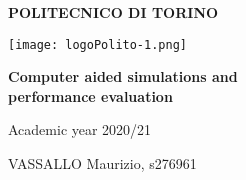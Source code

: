 \documentclass[twocolumn,letterpaper]{report}
\begin{document}

\setlength{\abovedisplayskip}{0pt}
\setlength{\belowdisplayskip}{3pt}
\setlength{\abovedisplayshortskip}{0pt}
\setlength{\belowdisplayshortskip}{3pt}

\begin{titlepage}
   \begin{center}
       \Huge
       \textbf{POLITECNICO DI TORINO}
       \vspace{1.5cm}
       
       \texttt{[image: logoPolito-1.png]}
       
       \hspace{0pt}
					\vfill
					
					\Huge
        \textbf{Computer aided simulations and \\
        								performance evaluation}
       \vspace{1cm}
       
       \Large
       Academic year 2020/21
       \vfill
       
       \vfill
				\hspace{0pt}
       \begin{flushright}
       			\large
            VASSALLO Maurizio, s276961
       \end{flushright}
   \end{center}
\end{titlepage}

\onecolumn
\tableofcontents
\newpage
\clearpage
\end{document}
